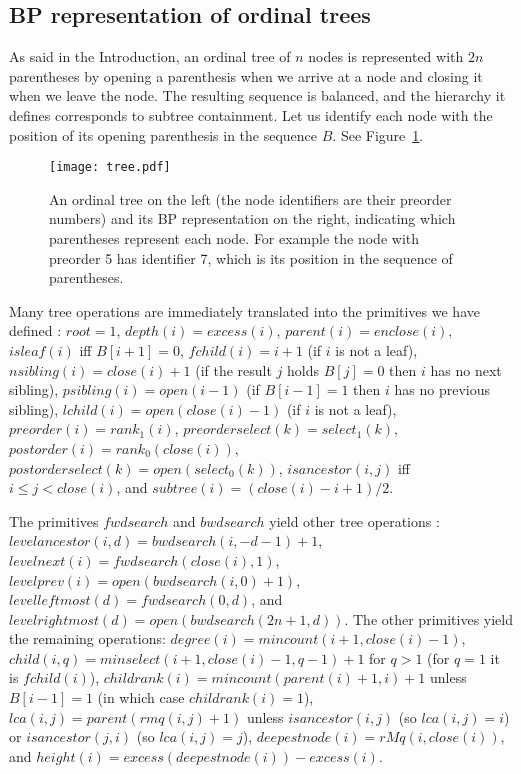 \documentclass[11pt]{article}
\newcommand{\0}{\mathit{0}}
\newcommand{\1}{\mathit{1}}
\newcommand{\rank}{\mathit{rank}}
\newcommand{\select}{\mathit{select}}
\newcommand{\excess}{\mathit{excess}}
\newcommand{\raiz}{\mathit{root}}
\newcommand{\fchild}{\mathit{fchild}}
\newcommand{\lchild}{\mathit{lchild}}
\newcommand{\nsibling}{\mathit{nsibling}}
\newcommand{\psibling}{\mathit{psibling}}
\newcommand{\parent}{\mathit{parent}}
\newcommand{\isleaf}{\mathit{isleaf}}
\newcommand{\degree}{\mathit{degree}}
\newcommand{\depth}{\mathit{depth}}
\newcommand{\height}{\mathit{height}}
\newcommand{\deepestnode}{\mathit{deepestnode}}
\newcommand{\subtree}{\mathit{subtree}}
\newcommand{\isancestor}{\mathit{isancestor}}
\newcommand{\levelanc}{\mathit{levelancestor}}
\newcommand{\preorder}{\mathit{preorder}}
\newcommand{\postorder}{\mathit{postorder}}
\newcommand{\preorderselect}{\mathit{preorderselect}}
\newcommand{\postorderselect}{\mathit{postorderselect}}
\newcommand{\child}{\mathit{child}}
\newcommand{\childrank}{\mathit{childrank}}
\newcommand{\lca}{\mathit{lca}}
\newcommand{\levelnext}{\mathit{levelnext}}
\newcommand{\levelprev}{\mathit{levelprev}}
\newcommand{\levelleftmost}{\mathit{levelleftmost}}
\newcommand{\levelrightmost}{\mathit{levelrightmost}}
\newcommand{\fwdsearch}{\mathit{fwdsearch}}
\newcommand{\bwdsearch}{\mathit{bwdsearch}}
\newcommand{\close}{\mathit{close}}
\newcommand{\open}{\mathit{open}}
\newcommand{\enclose}{\mathit{enclose}}
\newcommand{\rmq}{\mathit{rmq}}
\newcommand{\rMq}{\mathit{rMq}}
\newcommand{\mincount}{\mathit{mincount}}
\newcommand{\minselect}{\mathit{minselect}}
\begin{document}
\subsection{BP representation of ordinal trees}

As said in the Introduction, an ordinal tree of $n$ nodes is represented with
$2n$ parentheses by opening a parenthesis when we arrive at a node and closing
it when we leave the node. The resulting sequence is balanced, and the
hierarchy it defines corresponds to subtree containment. Let us identify
each node with the position of its opening parenthesis in the sequence $B$.
See Figure~\ref{fig:tree}.

\begin{figure}[t]
\centerline{\texttt{[image: tree.pdf]}}
\caption{An ordinal tree on the left (the node identifiers are their preorder
numbers) and its BP representation on the right, indicating which parentheses
represent each node. For example the node with preorder 5 has identifier 7,
which is its position in the sequence of parentheses.}
\label{fig:tree}
\end{figure}

Many tree operations are immediately translated into the primitives 
we have defined \cite{MR01}: $\raiz=1$,
$\depth(i)=\excess(i)$, $\parent(i)=\enclose(i)$,
$\isleaf(i)$ iff $B[i+1]=0$, $\fchild(i)=i+1$ (if $i$ is not a leaf),
$\nsibling(i)=\close(i)+1$ (if the result $j$ holds $B[j]=0$ then $i$ has no
next sibling), $\psibling(i)=\open(i-1)$ (if $B[i-1]=1$ then $i$ has no
previous sibling), $\lchild(i) = \open(\close(i)-1)$ (if $i$ is not a leaf),
$\preorder(i)=\rank_1(i)$, $\preorderselect(k)=\select_1(k)$,
$\postorder(i)=\rank_0(\close(i))$, $\postorderselect(k)=\open(\select_0(k))$,
$\isancestor(i,j)$ iff $i\le j <\close(i)$, and $\subtree(i)=(\close(i)-i+1)/2$.

The primitives $\fwdsearch$ and $\bwdsearch$ yield other tree 
operations \cite{NS14}: $\levelanc(i,d)=\bwdsearch(i,-d-1)+1$,
$\levelnext(i)=\fwdsearch(\close(i),1)$,
$\levelprev(i)=\open(\bwdsearch(i,0)+1)$,
$\levelleftmost(d)=\fwdsearch(0,d)$, and
$\levelrightmost(d)=\open(\bwdsearch(2n+1,d))$.
The other primitives yield the remaining operations:
$\degree(i)=\mincount(i+1,\close(i)-1)$,
$\child(i,q)=\minselect(i+1,\close(i)-1,q-1)+1$ for $q>1$
(for $q=1$ it is $\fchild(i)$),
$\childrank(i)=\mincount(\parent(i)+1,i)+1$ unless $B[i-1]=1$
(in which case $\childrank(i)=1$),
$\lca(i,j) = \parent(\rmq(i,j)+1)$ unless $\isancestor(i,j)$
(so $\lca(i,j)=i$) or $\isancestor(j,i)$ (so $\lca(i,j)=j$),
$\deepestnode(i)=\rMq(i,\close(i))$, and
$\height(i)=\excess(\deepestnode(i))-\excess(i)$.
\end{document}
